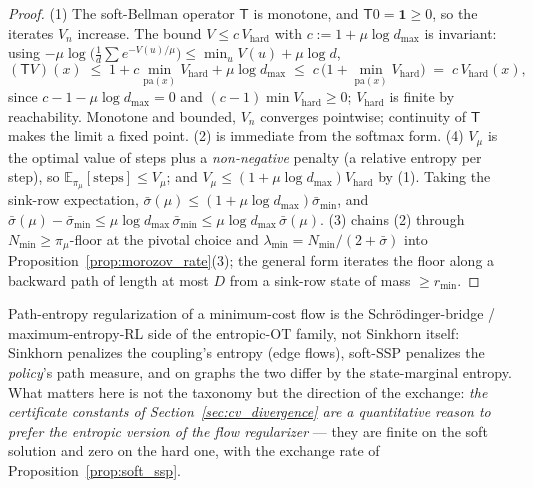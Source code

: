 \begin{proof}
(1) The soft-Bellman operator $\mathsf T$ is monotone, and $\mathsf T0=\mathbf 1\geq0$,
so the iterates $V_n$ increase. The bound $V\leq c\,V_{\mathrm{hard}}$ with
$c:=1+\mu\log d_{\max}$ is invariant: using
$-\mu\log\bigl(\tfrac1d\sum e^{-V(u)/\mu}\bigr)\leq\min_uV(u)+\mu\log d$,
\begin{equation*}
    (\mathsf TV)(x)\;\leq\;1+c\min_{\mathrm{pa}(x)}V_{\mathrm{hard}}+\mu\log d_{\max}
    \;\leq\;c\,\bigl(1+\min_{\mathrm{pa}(x)}V_{\mathrm{hard}}\bigr)\;=\;c\,V_{\mathrm{hard}}(x),
\end{equation*}
since $c-1-\mu\log d_{\max}=0$ and $(c-1)\min V_{\mathrm{hard}}\geq0$; $V_{\mathrm{hard}}$
is finite by reachability. Monotone and bounded, $V_n$ converges pointwise; continuity of
$\mathsf T$ makes the limit a fixed point. (2) is immediate from the softmax form.
(4) $V_\mu$ is the optimal value of steps plus a \emph{non-negative} penalty (a
relative entropy per step), so $\mathbb E_{\pi_\mu}[\mathrm{steps}]\leq V_\mu$; and
$V_\mu\leq(1+\mu\log d_{\max})V_{\mathrm{hard}}$ by (1). Taking the sink-row
expectation, $\bar\sigma(\mu)\leq(1+\mu\log d_{\max})\bar\sigma_{\min}$, and
$\bar\sigma(\mu)-\bar\sigma_{\min}\leq\mu\log d_{\max}\,\bar\sigma_{\min}\leq
\mu\log d_{\max}\,\bar\sigma(\mu)$. (3) chains (2) through
$N_{\min}\geq\pi_\mu$-floor at the pivotal choice and
$\lambda_{\min}=N_{\min}/(2+\bar\sigma)$ into Proposition~\ref{prop:morozov_rate}(3);
the general form iterates the floor along a backward path of length at most $D$ from a
sink-row state of mass $\geq r_{\min}$.
\end{proof}

\begin{remark}\label{rem:entropic_ot}
Path-entropy regularization of a minimum-cost flow is the Schr\"odinger-bridge /
maximum-entropy-RL side of the entropic-OT family, not Sinkhorn itself: Sinkhorn
penalizes the coupling's entropy (edge flows), soft-SSP penalizes the \emph{policy}'s
path measure, and on graphs the two differ by the state-marginal entropy. What matters
here is not the taxonomy but the direction of the exchange: \emph{the certificate
constants of Section~\ref{sec:cv_divergence} are a quantitative reason to prefer the
entropic version of the flow regularizer} --- they are finite on the soft solution and
zero on the hard one, with the exchange rate of Proposition~\ref{prop:soft_ssp}.
\end{remark}

